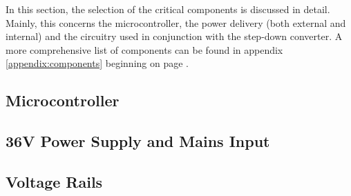 In  this  section, the  selection  of  the  critical components  is  discussed
in  detail. Mainly,  this concerns  the  microcontroller,  the power  delivery
(both  external   and  internal)  and   the  circuitry  used   in  conjunction
with  the  step-down  converter. A   more  comprehensive  list  of  components
can  be   found  in  appendix  \ref{appendix:components}   beginning  on  page
\pageref{appendix:components}.


\subsection{Microcontroller}



\subsection{36V Power Supply and Mains Input}



\subsection{Voltage Rails}



